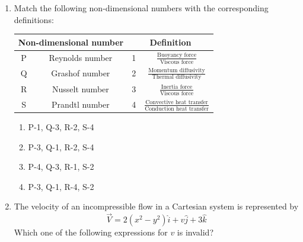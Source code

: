 \documentclass[12pt,onecolumn]{article}
\begin{document}
\begin{enumerate}
    \item Match the following non-dimensional numbers with the corresponding definitions:
          \begin{table}[H]
              \centering\large
              \begin{tabular}{|c|c|c|c|}
                  \hline
                  \multicolumn{2}{|c|}{\textbf{Non-dimensional number}} & \multicolumn{2}{|c|}{\textbf{Definition}}                                                                                 \\
                  \hline
                  P                                                     & Reynolds number                           & 1 & $\frac{\text{Buoyancy force}}{\text{Viscous force}}$                      \\\hline
                  Q                                                     & Grashof number                            & 2 & $\frac{\text{Momentum diffusivity}}{\text{Thermal diffusivity}}$          \\\hline
                  R                                                     & Nusselt number                            & 3 & $\frac{\text{Inertia force}}{\text{Viscous force}}$                       \\\hline
                  S                                                     & Prandtl number                            & 4 & $\frac{\text{Convective heat transfer}}{\text{Conduction heat transfer}}$ \\\hline
              \end{tabular}
              \label{tab:q15}
          \end{table}
          \begin{enumerate}
              \item P-1, Q-3, R-2, S-4
              \item P-3, Q-1, R-2, S-4
              \item P-4, Q-3, R-1, S-2
              \item P-3, Q-1, R-4, S-2
          \end{enumerate}

    \item The velocity of an incompressible flow in a Cartesian system is represented by
          \[
              \vec{V} = 2(x^2-y^2)\hat{i} + v\hat{j} + 3\hat{k}
          \]
          Which one of the following expressions for $v$ is invalid?
          \begin{enumerate}
          \end{enumerate}


\end{enumerate}
\end{document}
